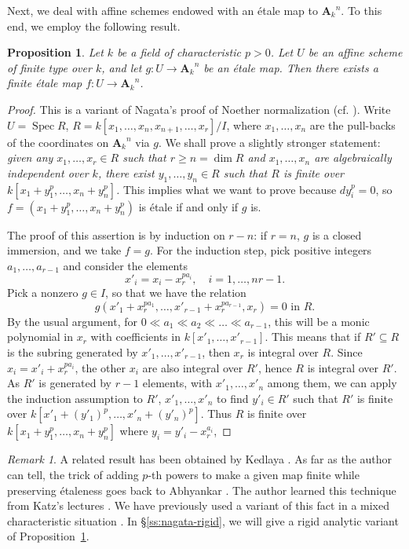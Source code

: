 \documentclass[twoside]{amsart}
\renewcommand{\AA}{\mathbf{A}}
\DeclareMathOperator{\Spec}{Spec}
\newcommand{\ANK}[2]{{\AA_{#2}}^{\! \! \! \!  #1}} %
\newcommand{\AN}[1]{\ANK{#1}{k}}
\renewcommand{\to}{\longrightarrow}
\theoremstyle{plain}
\newtheorem{proposition}[subsubsection]{Proposition}
\theoremstyle{definition}
\theoremstyle{remark}
\newtheorem{remark}[subsubsection]{Remark}
\numberwithin{equation}{subsection}
\begin{document}
Next, we deal with affine schemes endowed with an \'etale map to $\AN n$. To this end, we employ the following result.

\begin{proposition} \label{prop:nagatatrick}
	Let $k$ be a field of characteristic $p>0$. Let $U$ be an affine scheme of finite type over $k$, and let $g\colon U\to \AN{n}$ be an \'etale map. Then there exists a finite \'etale map $f\colon U\to \AN{n}$.
\end{proposition}

\begin{proof} 
This is a variant of Nagata's proof of Noether normalization (cf. \cite[I \S 1]{Mumford}). Write $U=\Spec R$, $R=k[x_1, \ldots, x_n, x_{n+1}, \ldots, x_r]/I$, where $x_1, \ldots, x_n$ are the pull-backs of the coordinates on $\AN{n}$ via $g$. We shall prove a slightly stronger statement: \emph{given any $x_1, \ldots, x_r\in R$ such that $r\geq n = \dim R$ and $x_1, \ldots, x_n$ are algebraically independent over $k$, there exist $y_1, \ldots, y_n \in R$ such that $R$ is finite over $k[x_1 + y_1^p, \ldots, x_n + y_n^p]$.} This implies what we want to prove because $dy_i^p = 0$, so $f=(x_1+y^p_1, \ldots, x_n+y^p_n)$ is \'etale if and only if $g$ is. 

The proof of this assertion is by induction on $r-n$: if $r=n$, $g$ is a closed immersion, and we take $f=g$. For the induction step, pick positive integers $a_1, \ldots, a_{r-1}$ and consider the elements
\[ 
	x'_i = x_i - x_r^{pa_i}, \quad i = 1, \ldots, nr-1. 
\]
Pick a nonzero $g\in I$, so that we have the relation
\[ 
	g(x'_1 + x_r^{pa_1}, \ldots, x'_{r-1} + x_r^{pa_{r-1}}, x_r) = 0 \text{ in }R.   
\]
By the usual argument, for $0 \ll a_1 \ll a_2 \ll \ldots \ll a_{r-1}$, this will be a monic polynomial in $x_r$ with coefficients in $k[x'_1, \ldots, x'_{r-1}]$. This means that if $R'\subseteq R$ is the subring generated by $x'_1, \ldots, x'_{r-1}$, then $x_r$ is integral over $R$. Since $x_i = x'_i + x_r^{pa_i}$, the other $x_i$ are also integral over $R'$, hence $R$ is integral over $R'$. As $R'$ is generated by $r-1$ elements, with $x'_1, \ldots, x'_n$ among them, we can apply the induction assumption to $R'$, $x'_1, \ldots, x'_n$ to find $y'_i \in R'$ such that $R'$ is finite over $k[x'_1+(y'_1)^{p}, \ldots, x'_n + (y'_n)^{p}]$. Thus $R$ is finite over $k[x_1+y^p_1, \ldots, x_n+y^p_n]$ where $y_i = y'_i - x_r^{a_i}$, 
\end{proof}

\begin{remark}
A related result has been obtained by Kedlaya \cite{Kedlaya}. As far as the author can tell, the trick of adding $p$-th powers to make a given map finite while preserving \'etaleness goes back to Abhyankar \cite{Abhyankar}. The author learned this technique from Katz's lectures \cite{Katz}. We have previously used a variant of this fact in a mixed characteristic situation \cite[Proposition~5.4]{Achinger}. In \S\ref{ss:nagata-rigid}, we will give a rigid analytic variant of Proposition~\ref{prop:nagatatrick}.
\end{remark}
\end{document}
